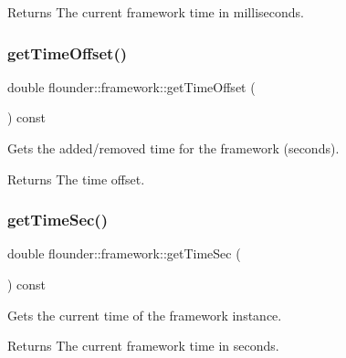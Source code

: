 \begin{DoxyReturn}{Returns}
The current framework time in milliseconds. 
\end{DoxyReturn}
\mbox{\label{classflounder_1_1framework_a611e6fcdc2f2f484ebf8bbbdceacd45b}} 
\subsubsection{\texorpdfstring{get\+Time\+Offset()}{getTimeOffset()}}
{\footnotesize\ttfamily double flounder\+::framework\+::get\+Time\+Offset (\begin{DoxyParamCaption}{ }\end{DoxyParamCaption}) const\hspace{0.3cm}{\ttfamily [inline]}}



Gets the added/removed time for the framework (seconds). 

\begin{DoxyReturn}{Returns}
The time offset. 
\end{DoxyReturn}
\mbox{\label{classflounder_1_1framework_acac765a2dd8e09267b7d6ce0620b8e55}} 
\subsubsection{\texorpdfstring{get\+Time\+Sec()}{getTimeSec()}}
{\footnotesize\ttfamily double flounder\+::framework\+::get\+Time\+Sec (\begin{DoxyParamCaption}{ }\end{DoxyParamCaption}) const\hspace{0.3cm}{\ttfamily [inline]}}



Gets the current time of the framework instance. 

\begin{DoxyReturn}{Returns}
The current framework time in seconds. 
\end{DoxyReturn}
\mbox{\label{classflounder_1_1framework_a88d0efc8e63448e5f342260ffd23054a}} 
